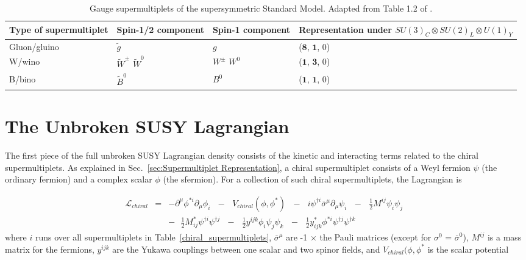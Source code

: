 \documentclass[dissertation.tex]{subfiles}
\begin{document}
\begin{table}[htbp]
\caption{Gauge supermultiplets of the supersymmetric Standard Model.  Adapted from Table 1.2 of \cite{SUSY_primer}.}
\begin{tabular}{|m{5.45cm}|m{2cm}|m{2cm}|m{4cm}|}
\hline
Type of supermultiplet & Spin-1/2 component & Spin-1 component & Representation under $SU(3)_{C} \otimes SU(2)_{L} \otimes U(1)_{Y}$ \\
\hline
\hline
Gluon/gluino & $\widetilde{g}$ & $g$ & ($\mathbf{8}$, $\mathbf{1}$, 0) \\
\hline
W/wino & $\widetilde{W}^{\pm}$ $\widetilde{W}^{0}$ & $W^{\pm}$ $W^{0}$ & ($\mathbf{1}$, $\mathbf{3}$, 0) \\
\hline
B/bino & $\widetilde{B}^{0}$ & $B^{0}$ & ($\mathbf{1}$, $\mathbf{1}$, 0) \\
\hline
\end{tabular}
\label{tab:gauge_supermultiplets}
\end{table}

\section{The Unbroken SUSY Lagrangian}
\label{sec:The Unbroken SUSY Lagrangian}

The first piece of the full unbroken SUSY Lagrangian density consists of the kinetic and interacting terms related to the chiral supermultiplets.  As explained in Sec.~\ref{sec:Supermultiplet Representation}, a chiral supermultiplet consists of a Weyl fermion $\psi$ (the ordinary fermion) and a complex scalar $\phi$ (the sfermion).  For a collection of such chiral supermultiplets, the Lagrangian is

\begin{eqnarray}
\label{eq:L_chiral}
\mathcal{L}_{chiral} &=& -\partial^{\mu}\phi^{*i}\partial_{\mu}\phi_{i}\mbox{ }-\mbox{ }V_{chiral}(\phi, \phi^{*})\mbox{ }-\mbox{ }i\psi^{\dag i}\overline{\sigma}^{\mu}\partial_{\mu}\psi_{i}\mbox{ }-\mbox{ }\frac{1}{2}M^{ij}\psi_{i}\psi_{j}\mbox{ }\nonumber \\
&&-\mbox{ }\frac{1}{2}M_{ij}^{*}\psi^{\dag i}\psi^{\dag j}\mbox{ }-\mbox{ }\frac{1}{2}y^{ijk}\phi_{i}\psi_{j}\psi_{k}\mbox{ }-\mbox{ }\frac{1}{2}y_{ijk}^{*}\phi^{*i}\psi^{\dag j}\psi^{\dag k}
\end{eqnarray}
where $i$ runs over all supermultiplets in Table~\ref{chiral_supermultiplets}, $\overline{\sigma}^{\mu}$ are -1 $\times$ the Pauli matrices (except for $\sigma^{0}$ = $\overline{\sigma}^{0}$), $M^{ij}$ is a mass matrix for the fermions, $y^{ijk}$ are the Yukawa couplings between one scalar and two spinor fields, and $V_{chiral}(\phi, \phi^{*}$ is the scalar potential
\end{document}
